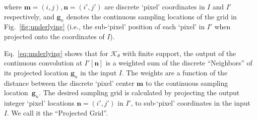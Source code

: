 where $\textbf{m}=(i,j),  \textbf{n}=(i',j')$ are discrete `pixel' coordinates in $I$ and $I'$ respectively, and $\textbf{g}_n$ denotes the continuous sampling locations of the grid
in Fig.~\ref{fig:underlying} 
(i.e., the sub-`pixel' position of  each `pixel' in $I'$ when projected onto the coordinates of $I$). 

Eq.~\ref{eq:underlying} shows that for $\mathcal{K}_\theta$ with finite support, the output of the continuous convolution at $I'[\textbf{n}]$ is a weighted sum of the discrete ``Neighbors'' of its projected location  $\textbf{g}_n$ in the input $I$. The weights are a function of the distance between the discrete `pixel' center  $\textbf{m}$  to the continuous sampling location~$\textbf{g}_n$.
%
The desired sampling grid  is calculated by projecting the output integer `pixel' locations $\textbf{n}=(i',j')$ in $I'$, to sub-`pixel' coordinates in the input $I$. 
We call it the {``Projected Grid''}. 






